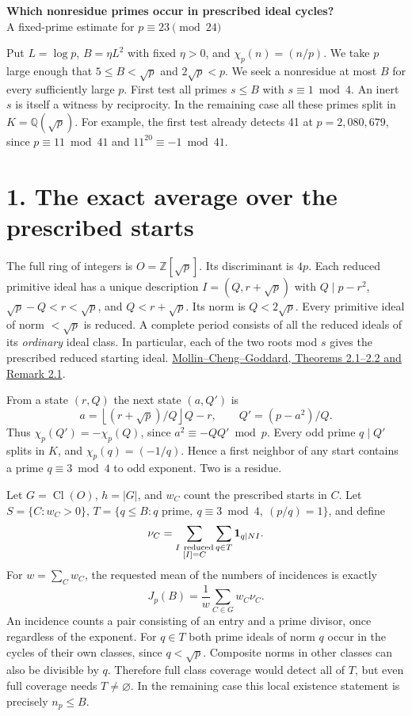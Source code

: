 \documentclass[11pt]{article}
\newcommand{\ch}{\chi_p}
\newcommand{\Q}{\mathbb Q}
\newcommand{\Z}{\mathbb Z}
\newcommand{\src}{\href{https://www.kurims.kyoto-u.ac.jp/EMIS/journals/AMUC/_vol-71/_no_2/_mollin/mollin.pdf}{Mollin--Cheng--Goddard, Theorems 2.1--2.2 and Remark 2.1}}
\begin{document}
{\Large\bfseries Which nonresidue primes occur in prescribed ideal cycles?}\\[2pt]
{\large A fixed-prime estimate for \(p\equiv23\pmod{24}\)}

Put \(L=\log p\), \(B=\eta L^2\) with fixed \(\eta>0\), and \(\ch(n)=(n/p)\).
We take \(p\) large enough that \(5\le B<\sqrt p\) and \(2\sqrt p<p\).
We seek a nonresidue at most \(B\) for every sufficiently large \(p\).
First test all primes \(s\le B\) with \(s\equiv1\bmod4\).
An inert \(s\) is itself a witness by reciprocity. In the remaining case
all these primes split in \(K=\Q(\sqrt p)\). For example, the first test
already detects 41 at \(p=2{,}080{,}679\), since \(p\equiv11\bmod41\)
and \(11^{20}\equiv-1\bmod41\).

\section*{1. The exact average over the prescribed starts}
The full ring of integers is \(O=\Z[\sqrt p]\). Its discriminant is \(4p\).
Each reduced primitive ideal has a unique description
\(I=(Q,r+\sqrt p)\) with \(Q\mid p-r^2\), \(\sqrt p-Q<r<\sqrt p\),
and \(Q<r+\sqrt p\). Its norm is \(Q<2\sqrt p\). Every primitive ideal of
norm \(<\sqrt p\) is reduced. A complete period consists of all the reduced
ideals of its \emph{ordinary} ideal class. In particular, each of the two
roots mod \(s\) gives the prescribed reduced starting ideal. \src.

From a state \((r,Q)\) the next state \((a,Q')\) is
\[
 a=\left\lfloor(r+\sqrt p)/Q\right\rfloor Q-r,\qquad Q'=(p-a^2)/Q.
\]
Thus \(\ch(Q')=-\ch(Q)\), since \(a^2\equiv-QQ'\bmod p\).
Every odd prime \(q\mid Q'\) splits in \(K\), and
\(\ch(q)=(-1/q)\). Hence a first neighbor of any start contains a prime
\(q\equiv3\bmod4\) to odd exponent. Two is a residue.

Let \(G=\operatorname{Cl}(O)\), \(h=|G|\), and \(w_C\) count the prescribed
starts in \(C\). Let \(S=\{C:w_C>0\}\), \(T=\{q\le B:q\text{ prime},
\ q\equiv3\bmod4,\ (p/q)=1\}\), and define
\[
 \nu_C=\sum_{\substack{I\ {\rm reduced}\\ [I]=C}}\sum_{q\in T}
             {\bf1}_{q\mid NI}.
\]
For \(w=\sum_Cw_C\), the requested mean of the numbers of incidences is exactly
\begin{equation}
 J_p(B)=\frac1w\sum_{C\in G}w_C\nu_C .
\end{equation}
An incidence counts a pair consisting of an entry and a prime divisor, once
regardless of the exponent. For \(q\in T\) both prime ideals of norm \(q\)
occur in the cycles of their own classes, since \(q<\sqrt p\). Composite norms in other classes
can also be divisible by \(q\). Therefore full class coverage would detect
all of \(T\), but even full coverage needs \(T\ne\varnothing\). In the
remaining case this local existence statement is precisely \(n_p\le B\).
\end{document}
